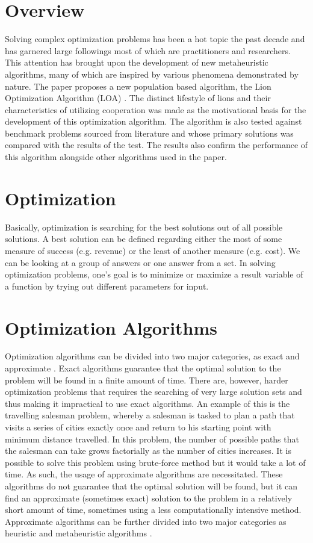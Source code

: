 \section{Overview}
Solving complex optimization problems has been a hot topic the past decade and has garnered large followings most of which are practitioners and researchers. This attention has brought upon the development of new metaheuristic algorithms, many of which are inspired by various phenomena demonstrated by nature.
The paper proposes a new population based algorithm, the Lion Optimization Algorithm (LOA) \cite{loa_2016}. The distinct lifestyle of lions and their characteristics of utilizing cooperation was made as the motivational basis for the development of this optimization algorithm. The algorithm is also tested against benchmark problems sourced from literature and whose primary solutions was compared with the results of the test. The results also confirm the performance of this algorithm alongside other algorithms used in the paper.

\section{Optimization}
Basically, optimization is searching for the best solutions out of all possible solutions. A best solution can be defined regarding either the most of some measure of success (e.g. revenue) or the least of another measure (e.g. cost). We can be looking at a group of answers or one answer from a set. In solving optimization problems, one's goal is to minimize or maximize a result variable of a function by trying out different parameters for input.

\section{Optimization Algorithms}
Optimization algorithms can be divided into two major categories, as exact and approximate \cite{desale_2015}. Exact algorithms guarantee that the optimal solution to the problem will be found in a finite amount of time. There are, however, harder optimization problems that requires the searching of very large solution sets and thus making it impractical to use exact algorithms. An example of this is the travelling salesman problem, whereby a salesman is tasked to plan a path that visits a series of cities exactly once and return to his starting point with minimum distance travelled. In this problem, the number of possible paths that the salesman can take grows factorially as the number of cities increases. It is possible to solve this problem using brute-force method but it would take a lot of time. As such, the usage of approximate algorithms are necessitated. These algorithms do not guarantee that the optimal solution will be found, but it can find an approximate (sometimes exact) solution to the problem in a relatively short amount of time, sometimes using a less computationally intensive method. Approximate algorithms can be further divided into two major categories as heuristic and metaheuristic algorithms \cite{desale_2015}.

